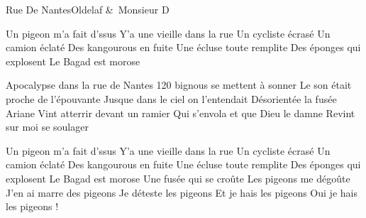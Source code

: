 \documentclass[a4paper,11pt,french]{article}
\begin{document}
\begin{Song}{Rue De Nantes}{Oldelaf \&\ Monsieur D}
\begin{multicols}{2}
\begin{Chorus}
Un pigeon m'a fait d'ssus
Y'a une vieille dans la rue
Un cycliste écrasé
Un camion éclaté
Des kangourous en fuite
Une écluse toute remplite
Des éponges qui explosent
Le Bagad est morose
\end{Chorus}
\espaceInterStrophe

\begin{Verse}
Apocalypse dans la rue de Nantes
120 bignous se mettent à sonner
Le son était proche de l'épouvante
Jusque dans le ciel on l'entendait
Désorientée la fusée Ariane
Vint atterrir devant un ramier
Qui s'envola et que Dieu le damne
Revint sur moi se soulager
\end{Verse}
\espaceInterStrophe

\begin{Chorus}
Un pigeon m'a fait d'ssus
Y'a une vieille dans la rue
Un cycliste écrasé
Un camion éclaté
Des kangourous en fuite
Une écluse toute remplite
Des éponges qui explosent
Le Bagad est morose
Une fusée qui se croûte
Les pigeons me dégoûte
J'en ai marre des pigeons
Je déteste les pigeons
Et je hais les pigeons
Oui je hais les pigeons !
\end{Chorus}
\end{multicols}

\end{Song}

\end{document}
